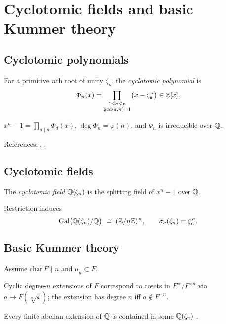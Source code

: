 \section{Cyclotomic fields and basic Kummer theory}\label{sec:cyclotomic-kummer}

\subsection{Cyclotomic polynomials}
\begin{definition}
For a primitive $n$th root of unity $\zeta_n$, the \emph{cyclotomic polynomial} is
\[
\Phi_n(x)=\prod_{\substack{1\le a\le n\\ \gcd(a,n)=1}}\bigl(x-\zeta_n^{\,a}\bigr)\in\mathbb{Z}[x].
\]
\end{definition}
\begin{theorem}
$x^n-1=\prod_{d\mid n}\Phi_d(x)$, $\deg\Phi_n=\varphi(n)$, and $\Phi_n$ is irreducible over $\mathbb{Q}$.
\end{theorem}
References: \cite[\S13]{DF}, \cite[Ch.~VIII]{Lang}.

\subsection{Cyclotomic fields}
\begin{definition}
The \emph{cyclotomic field} $\mathbb{Q}(\zeta_n)$ is the splitting field of $x^n-1$ over $\mathbb{Q}$.
\end{definition}
\begin{theorem}
Restriction induces
\[
\Gal\bigl(\Q(\zeta_n)/\Q\bigr)\ \cong\ (\Z/n\Z)^\times,\qquad \sigma_a(\zeta_n)=\zeta_n^{\,a}.
\]
\end{theorem}

\subsection{Basic Kummer theory}
Assume $\mathrm{char}\,F\nmid n$ and $\mu_n\subset F$.
\begin{theorem}[Kummer]
Cyclic degree-$n$ extensions of $F$ correspond to cosets in $F^\times/F^{\times n}$ via $a\mapsto F(\sqrt[n]{a})$; the extension has degree $n$ iff $a\notin F^{\times n}$.
\end{theorem}
\begin{remark}
Every finite abelian extension of $\mathbb{Q}$ is contained in some $\mathbb{Q}(\zeta_n)$ \cite{Neukirch}.
\end{remark}
